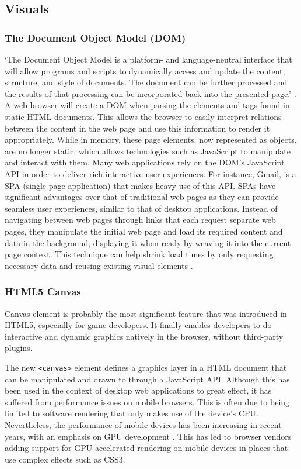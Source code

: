 \documentclass[final]{cmpreport}
\begin{document}

\subsection{Visuals}

\subsubsection{The Document Object Model (DOM)}
`The Document Object Model is a platform- and language-neutral interface that will allow programs and scripts to dynamically access and update the content, structure, and style of documents. The document can be further processed and the results of that processing can be incorporated back into the presented page.' \citep{W3C3}. A web browser will create a DOM when parsing the elements and tags found in static HTML documents. This allows the browser to easily interpret relations between the content in the web page and use this information to render it appropriately. While in memory, these page elements, now represented as objects, are no longer static, which allows technologies such as JavaScript to manipulate and interact with them. Many web applications rely on the DOM's JavaScript API in order to deliver rich interactive user experiences. For instance, Gmail, is a SPA (single-page application) that makes heavy use of this API. SPAs have significant advantages over that of traditional web pages as they can provide seamless user experiences, similar to that of desktop applications. Instead of navigating between web pages through links that each request separate web pages, they manipulate the initial web page and load its required content and data in the background, displaying it when ready by weaving it into the current page context. This technique can help shrink load times by only requesting necessary data and reusing existing visual elements \citep{Takada}.

\subsubsection{HTML5 Canvas}
Canvas element is probably the most significant feature that was introduced in HTML5, especially for game developers. It finally enables developers to do interactive and dynamic graphics natively in the browser, without third-party plugins.

The new \texttt{<canvas>} element defines a graphics layer in a HTML document that can be manipulated and drawn to through a JavaScript API. Although this has been used in the context of desktop web applications to great effect, it has suffered from performance issues on mobile browsers. This is often due to being limited to software rendering that only makes use of the device's CPU. Nevertheless, the performance of mobile devices has been increasing in recent years, with an emphasis on GPU development \citep{Lin}. This has led to browser vendors adding support for GPU accelerated rendering on mobile devices in places that use complex effects such as CSS3.
\end{document}

